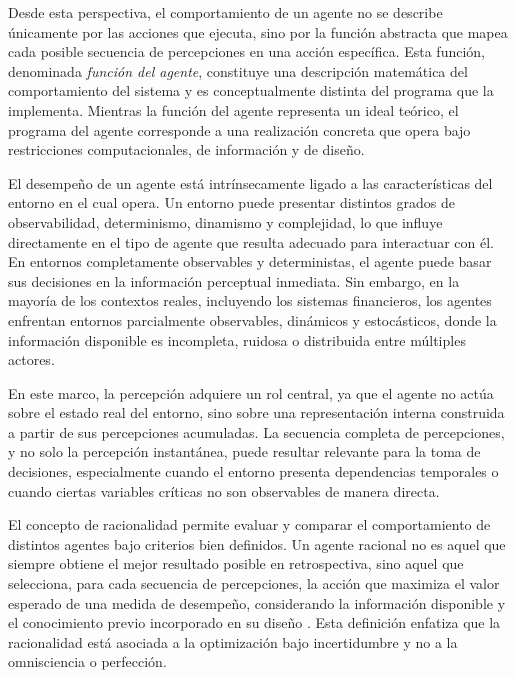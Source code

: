 \documentclass[
	spanish, %
	letterpaper, oneside
]{book}
\begin{document}
Desde esta perspectiva, el comportamiento de un agente no se describe únicamente por las acciones que ejecuta, sino por la función abstracta que mapea cada posible secuencia de percepciones en una acción específica. Esta función, denominada \emph{función del agente}, constituye una descripción matemática del comportamiento del sistema y es conceptualmente distinta del programa que la implementa. Mientras la función del agente representa un ideal teórico, el programa del agente corresponde a una realización concreta que opera bajo restricciones computacionales, de información y de diseño.


El desempeño de un agente está intrínsecamente ligado a las características del entorno en el cual opera. Un entorno puede presentar distintos grados de observabilidad, determinismo, dinamismo y complejidad, lo que influye directamente en el tipo de agente que resulta adecuado para interactuar con él. En entornos completamente observables y deterministas, el agente puede basar sus decisiones en la información perceptual inmediata. Sin embargo, en la mayoría de los contextos reales, incluyendo los sistemas financieros, los agentes enfrentan entornos parcialmente observables, dinámicos y estocásticos, donde la información disponible es incompleta, ruidosa o distribuida entre múltiples actores.

En este marco, la percepción adquiere un rol central, ya que el agente no actúa sobre el estado real del entorno, sino sobre una representación interna construida a partir de sus percepciones acumuladas. La secuencia completa de percepciones, y no solo la percepción instantánea, puede resultar relevante para la toma de decisiones, especialmente cuando el entorno presenta dependencias temporales o cuando ciertas variables críticas no son observables de manera directa.


El concepto de racionalidad permite evaluar y comparar el comportamiento de distintos agentes bajo criterios bien definidos. Un agente racional no es aquel que siempre obtiene el mejor resultado posible en retrospectiva, sino aquel que selecciona, para cada secuencia de percepciones, la acción que maximiza el valor esperado de una medida de desempeño, considerando la información disponible y el conocimiento previo incorporado en su diseño \cite{russell2010aima}. Esta definición enfatiza que la racionalidad está asociada a la optimización bajo incertidumbre y no a la omnisciencia o perfección.
\end{document}
